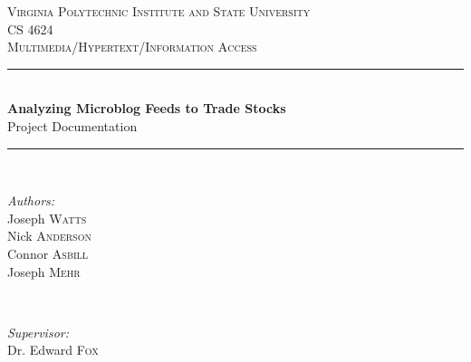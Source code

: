 
\begin{titlepage}

\newcommand{\HRule}{\rule{\linewidth}{0.5mm}} %

\center %
 

\LARGE\textsc{Virginia Polytechnic Institute and State University}\\[0.5cm] %
\textsc{\Large CS 4624}\\ %
\textsc{\large Multimedia/Hypertext/Information Access}\\[0.5cm] %


\HRule \\[0.4cm]
{ \huge \bfseries Analyzing Microblog Feeds to Trade Stocks}\\[0.2cm] %
{ \large \sc Project Documentation}
\HRule \\[1.5cm]
 

\begin{minipage}{0.4\textwidth}
\begin{flushleft} \large
\emph{Authors:}\\
Joseph \textsc{Watts} \\
Nick \textsc{Anderson} \\
Connor \textsc{Asbill} \\
Joseph \textsc{Mehr}

\end{flushleft}
\end{minipage}
~
\begin{minipage}{0.4\textwidth}
\begin{flushright} \large
\emph{Supervisor:} \\
Dr. Edward \textsc{Fox} \\[1em]


\end{flushright}
\end{minipage}
\end{titlepage}
